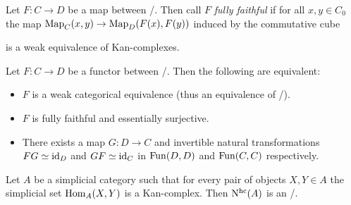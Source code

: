 \begin{definition}
    Let $F\colon C\to D$ be a map between \inftycats/.
    Then call $F$ \emph{fully faithful} if for all $x,y\in C_0$ the map $\operatorname{Map}_C(x,y)\to\operatorname{Map}_D(F(x),F(y))$ induced by the commutative cube
    \begin{center}
    \end{center}
    is a weak equivalence of Kan-complexes.
\end{definition}
\begin{thm}\label{thm:eqCharEqOfInftycats}
    Let $F\colon C\to D$ be a functor between \inftycats/.
    Then the following are equivalent:
    \begin{itemize}
        \item $F$ is a weak categorical equivalence (thus an equivalence of \inftycats/).
        \item $F$ is fully faithful and essentially surjective.
        \item There exists a map $G\colon D\to C$ and invertible natural transformations $FG\simeq \text{id}_D$ and $GF\simeq \text{id}_C$ in $\operatorname{Fun}(D,D)$ and $\operatorname{Fun}(C,C)$ respectively.
    \end{itemize}
    \begin{reference}
        \cite[Corollary 3.6.6 and Theorem 3.9.7]{cisinski_2019}
    \end{reference}
\end{thm}
\begin{prop}
    Let $A$ be a simplicial category such that for every pair of objects $X,Y\in A$ the simplicial set $\operatorname{Hom}_A(X,Y)$ is a Kan-complex.
    Then $\operatorname{N^{hc}}(A)$ is an \inftycat/.
    \begin{reference}
        \cite[Theorem 2.4.5.1]{kerodon}
    \end{reference}
\end{prop}
